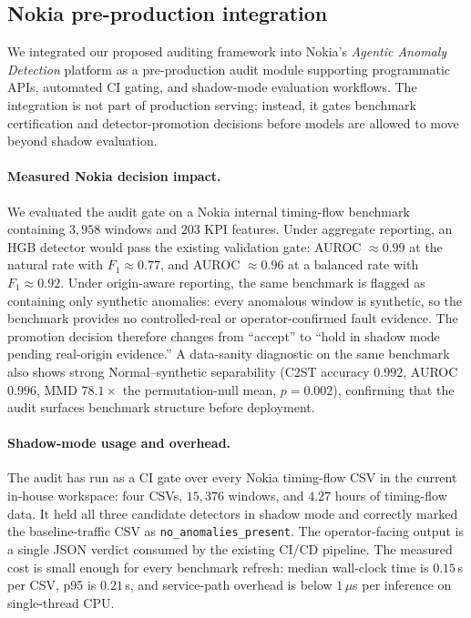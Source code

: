 \documentclass[sigconf,review]{acmart}
\begin{document}
\subsection{Nokia pre-production integration}
\label{sec:nokia-deployment}
We integrated our proposed auditing framework into Nokia’s \emph{Agentic Anomaly Detection} platform as a pre-production audit module supporting programmatic APIs, automated CI gating, and shadow-mode evaluation workflows. The integration is not part of production serving; instead, it gates benchmark certification and detector-promotion decisions before models are allowed to move beyond shadow evaluation.

\paragraph{Measured Nokia decision impact.}
We evaluated the audit gate on a Nokia internal timing-flow benchmark containing $3{,}958$ windows and $203$ KPI features. Under aggregate reporting, an HGB detector would pass the existing validation gate: AUROC $\approx0.99$ at the natural rate with $F_1\approx0.77$, and AUROC $\approx0.96$ at a balanced rate with $F_1\approx0.92$. Under origin-aware reporting, the same benchmark is flagged as containing only synthetic anomalies: every anomalous window is synthetic, so the benchmark provides no controlled-real or operator-confirmed fault evidence. The promotion decision therefore changes from ``accept'' to ``hold in shadow mode pending real-origin evidence.'' A data-sanity diagnostic on the same benchmark also shows strong Normal--synthetic separability (C2ST accuracy $0.992$, AUROC $0.996$, MMD $78.1\times$ the permutation-null mean, $p=0.002$), confirming that the audit surfaces benchmark structure before deployment.

\paragraph{Shadow-mode usage and overhead.}
The audit has run as a CI gate over every Nokia timing-flow CSV in the current in-house workspace: four CSVs, $15{,}376$ windows, and $4.27$ hours of timing-flow data. It held all three candidate detectors in shadow mode and correctly marked the baseline-traffic CSV as \texttt{no\_anomalies\_present}. The operator-facing output is a single JSON verdict consumed by the existing CI/CD pipeline. The measured cost is small enough for every benchmark refresh: median wall-clock time is $0.15$\,s per CSV, p95 is $0.21$\,s, and service-path overhead is below $1\,\mu$s per inference on single-thread CPU.
\end{document}
